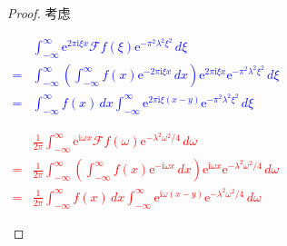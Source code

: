 \documentclass{ctexbook}
\newcommand{\lr}[2]{%
    \begin{center}
    \begin{minipage}[t]{0.45\textwidth}
        \centering
        \allowdisplaybreaks
        \textcolor{blue}{%
            \begin{varwidth}{\linewidth}
            $\begin{aligned}
            #1
            \end{aligned}$
            \end{varwidth}
        }
    \end{minipage}
    \hfill
    \begin{minipage}[t]{0.45\textwidth}
        \centering
        \allowdisplaybreaks
        \textcolor{red}{%
            \begin{varwidth}{\linewidth}
            $\begin{aligned}
            #2
            \end{aligned}$
            \end{varwidth}
        }
    \end{minipage}
\end{center}
}
\begin{document}
\begin{proof}
    考虑
\lr{
    &\int_{-\infty}^{\infty}\mathrm{e}^{2\pi \mathrm{i}\xi x}\mathcal{F} f(\xi)\mathrm{e}^{-\pi^2\lambda^2 \xi^2}\,d\xi\\
    =&\int_{-\infty}^{\infty}\left(\int_{-\infty}^{\infty}f(x)\mathrm{e}^{-2\pi \mathrm{i}\xi x}\,dx\right)\mathrm{e}^{2\pi \mathrm{i}\xi x}\mathrm{e}^{-\pi^2 \lambda^2 \xi^2}\,d\xi\\
    =&\int_{-\infty}^{\infty}f(x)\,dx\int_{-\infty}^{\infty}\mathrm{e}^{2\pi \mathrm{i}\xi (x-y)}\mathrm{e}^{-\pi^2 \lambda^2 \xi^2}\,d\xi
}{
    &\frac{1}{2\pi}\int_{-\infty}^{\infty}\mathrm{e}^{\mathrm{i}\omega x}\mathcal{F} f(\omega)\mathrm{e}^{-\lambda^2\omega^2/4}\,d\omega\\
    =&\frac{1}{2\pi}\int_{-\infty}^{\infty}\left(\int_{-\infty}^{\infty}f(x)\mathrm{e}^{-\mathrm{i}\omega x}\,dx\right)\mathrm{e}^{\mathrm{i}\omega x}\mathrm{e}^{-\lambda^2\omega^2/4}\,d\omega\\
    =&\frac{1}{2\pi}\int_{-\infty}^{\infty}f(x)\,dx\int_{-\infty}^{\infty}\mathrm{e}^{\mathrm{i}\omega (x-y)}\mathrm{e}^{-\lambda^2\omega^2/4}\,d\omega
}


\end{proof}
\end{document}
